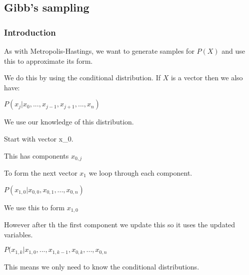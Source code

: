 
\subsection{Gibb's sampling}

\subsubsection{Introduction}

As with Metropolis-Hastings, we want to generate samples for \(P(X)\) and use this to approximate its form.

We do this by using the conditional distribution. If \(X\) is a vector then we also have:

\(P(x_j|x_0,...,x_{j-1},x_{j+1},...,x_n)\)

We use our knowledge of this distribution.

Start with vector x_0.

This has components \(x_{0,j}\)

To form the next vector \(x_1\) we loop through each component.

\(P(x_{1,0}|x_{0,0},x_{0,1},...,x_{0,n})\)

We use this to form \(x_{1,0}\)

However after th the first component we update this so it uses the updated variables.

\(P(x_{1,k}|x_{1,0},...,x_{1,k-1},x_{0,k},...,x_{0,n}\)

This means we only need to know the conditional distributions.

